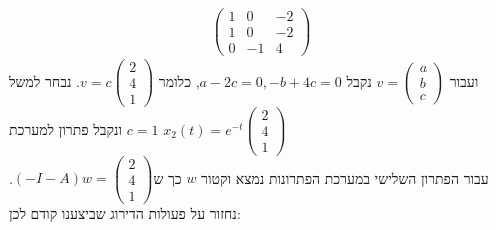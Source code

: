 \documentclass{article}
\begin{document}
\begin{align*}
\begin{pmatrix}
                                                                                                                    1 & 0  & -2 \\
                                                                                                                    1 & 0  & -2 \\
                                                                                                                    0 & -1 & 4
                                                                                                                \end{pmatrix}
\end{align*}
ועבור $v=\begin{pmatrix}
        a \\
        b \\
        c
    \end{pmatrix}$ נקבל $a-2c=0, -b+4c=0$, כלומר $v=c\begin{pmatrix}
        2 \\
        4 \\
        1
    \end{pmatrix}$. נבחר למשל $c=1$ ונקבל פתרון למערכת $x_2(t)=e^{-t}\begin{pmatrix}
        2 \\
        4 \\
        1
    \end{pmatrix}$\\
עבור הפתרון השלישי במערכת הפתרונות נמצא וקטור $w$ כך ש$(-I-A)w=\begin{pmatrix}
        2 \\
        4 \\
        1
    \end{pmatrix}$. נחזור על פעולות הדירוג שביצענו קודם לכן:
\end{document}

